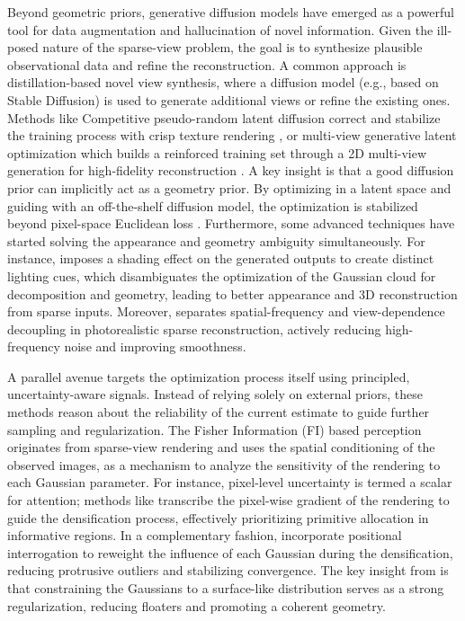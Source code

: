 \documentclass[11pt,a4paper]{article}
\begin{document}
Beyond geometric priors, generative diffusion models have emerged as a powerful tool for data augmentation and hallucination of novel information. Given the ill-posed nature of the sparse-view problem, the goal is to synthesize plausible observational data and refine the reconstruction. A common approach is distillation-based novel view synthesis, where a diffusion model (e.g., based on Stable Diffusion) is used to generate additional views or refine the existing ones. Methods like Competitive pseudo-random latent diffusion correct and stabilize the training process with crisp texture rendering \cite{arxiv:2401.03890v2}, or multi-view generative latent optimization which builds a reinforced training set through a 2D multi-view generation for high-fidelity reconstruction \cite{arxiv:2503.19452v1}. A key insight is that a good diffusion prior can implicitly act as a geometry prior. By optimizing in a latent space and guiding with an off-the-shelf diffusion model, the optimization is stabilized beyond pixel-space Euclidean loss \cite{arxiv:2510.10257v1}. Furthermore, some advanced techniques have started solving the appearance and geometry ambiguity simultaneously. For instance, \cite{arxiv:2505.20729v1} imposes a shading effect on the generated outputs to create distinct lighting cues, which disambiguates the optimization of the Gaussian cloud for decomposition and geometry, leading to better appearance and 3D reconstruction from sparse inputs. Moreover, \cite{arxiv:2505.20729v1} separates spatial-frequency and view-dependence decoupling in photorealistic sparse reconstruction, actively reducing high-frequency noise and improving smoothness.

A parallel avenue targets the optimization process itself using principled, uncertainty-aware signals. Instead of relying solely on external priors, these methods reason about the reliability of the current estimate to guide further sampling and regularization. The Fisher Information (FI) based perception originates from sparse-view rendering and uses the spatial conditioning of the observed images, as a mechanism to analyze the sensitivity of the rendering to each Gaussian parameter. For instance, pixel-level uncertainty is termed a scalar for attention; methods like \cite{arxiv:2504.00773v1} transcribe the pixel-wise gradient of the rendering to guide the densification process, effectively prioritizing primitive allocation in informative regions. In a complementary fashion, \cite{arxiv:2403.17898v1} incorporate positional interrogation to reweight the influence of each Gaussian during the densification, reducing protrusive outliers and stabilizing convergence. The key insight from \cite{arxiv:2511.14633v1} is that constraining the Gaussians to a surface-like distribution serves as a strong regularization, reducing floaters and promoting a coherent geometry.
\end{document}
